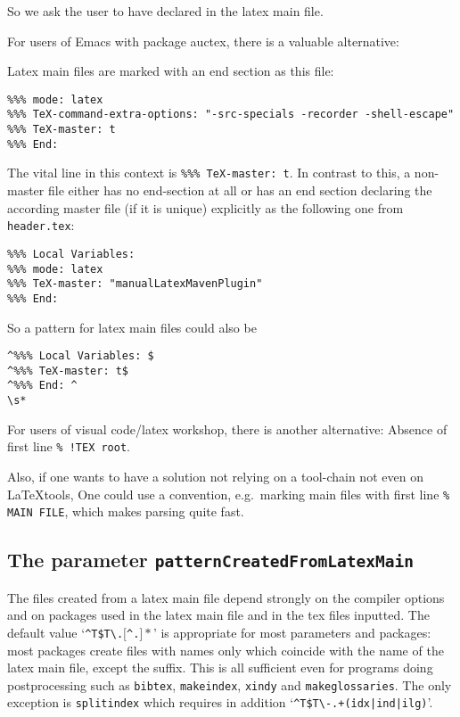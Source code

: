 So we ask the user to have  
declared in the latex main file. 

For users of Emacs with package auctex, there is a valuable alternative: 

Latex main files are marked with an end section as this file: 
%
\begin{Verbatim}[fontsize=\footnotesize]
%%% Local Variables: 
%%% mode: latex
%%% TeX-command-extra-options: "-src-specials -recorder -shell-escape" 
%%% TeX-master: t
%%% End: 
\end{Verbatim}
% 
The vital line in this context is \texttt{\%\%\% TeX-master: t}. 
In contrast to this, a non-master file 
either has no end-section at all or has an end section 
declaring the according master file (if it is unique) 
explicitly as the following one from \texttt{header.tex}: 
%
\begin{verbatim}
%%% Local Variables:
%%% mode: latex
%%% TeX-master: "manualLatexMavenPlugin"
%%% End:
\end{verbatim}

So a pattern for latex main files could also be 
%
\begin{verbatim}
^%%% Local Variables: $
^%%% TeX-master: t$
^%%% End: ^
\s*
\end{verbatim}

For users of visual code/latex workshop, there is another alternative: 
Absence of first line \texttt{\% !TEX root}. 

Also, if one wants to have a solution not relying on a tool-chain 
not even on \LaTeX tools, 
One could use a convention, e.g.~marking main files with first line \texttt{\% MAIN FILE}, 
which makes parsing quite fast. 


\subsection{The parameter \texttt{patternCreatedFromLatexMain}}
\label{subsec:patternCreatedFromLatexMain}

The files created from a latex main file 
depend strongly on the compiler options 
and on packages used in the latex main file 
and in the tex files inputted. 
The default value 
`\texttt{\^{}T\$T\textbackslash.$[$\^{}.$]*$}' 
is appropriate for most parameters and packages: 
most packages create files with names only 
which coincide with the name of the latex main file, except the suffix. 
This is all sufficient even for programs doing postprocessing 
such as \texttt{bibtex}, \texttt{makeindex}, \texttt{xindy} and 
\texttt{makeglossaries}. 
The only exception is \texttt{splitindex} 
which requires in addition 
`\texttt{\^{}T\$T\textbackslash-.+\.(idx|ind|ilg)}'. 

